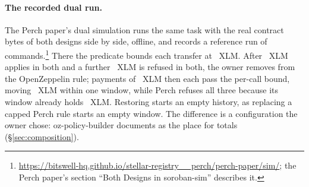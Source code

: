 
\paragraph{The recorded dual run.} The Perch paper's dual simulation runs the
same task with the real contract bytes of both designs side by side, offline, and
records a reference run of 
commands.\footnote{\url{https://bitswell-hq.github.io/stellar-registry__perch/perch-paper/sim/};
the Perch paper's section ``Both Designs in soroban-sim'' describes it.} There
the predicate bounds each transfer at ~XLM. After
~XLM applies in both and a further ~XLM is
refused in both, the owner removes  from the OpenZeppelin
rule;  payments of ~XLM then each
pass the per-call bound, moving ~XLM within one
window, while Perch refuses all three because its window already holds
~XLM. Restoring 
starts an empty history, as replacing a capped Perch rule starts an empty window.
The difference is a configuration the owner chose: oz-policy-builder documents
 as the place for totals (\S\ref{sec:composition}).
